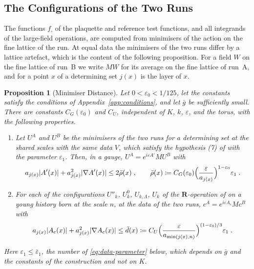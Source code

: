 \documentclass[11pt]{preprint}
\DeclarePairedDelimiter{\abs}{\lvert}{\rvert}
\numberwithin{equation}{section}
\newtheorem{proposition}[theorem]{Proposition}
\theoremstyle{definition}
\theoremstyle{remark}
\theoremstyle{plain}
\begin{document}
\subsection{The Configurations of the Two Runs}\label{sec:configurations}

The functions $f_\square$ of the plaquette and reference test functions, and all integrands of the large-field operations, are computed from minimisers of the action on the fine lattice of the run. At equal data the minimisers of the two runs differ by a lattice artefact, which is the content of the following proposition. For a field $W$ on the fine lattice of run~B we write $MW$ for its average on the fine lattice of run~A, and for a point $x$ of a determining set $j(x)$ is the layer of $x$.

\begin{proposition}[Minimiser Distance]\label{prop:minimiser-distance}
Let $0 < \varepsilon_0 < 1/125$, let the constants satisfy the conditions of Appendix~\ref{app:conditions}, and let $\bar g$ be sufficiently small. There are constants $C_G(\varepsilon_0)$ and $C_U$, independent of $K$, $k$, $\varepsilon$, and the torus, with the following properties.
\begin{enumerate}[label=(\roman*)]
\item Let $U^A$ and $U^B$ be the minimisers of the two runs for a determining set at the shared scales with the same data $V$, which satisfy the hypothesis (7) of \cite[Theorem~1, p.~279]{BalabanVAR} with the parameter $\varepsilon_1$. Then, in a gauge, $U^A = e^{i\varepsilon A'}MU^B$ with
\begin{equation}\label{eq:minimiser-distance}
    a_{j(x)}\abs{A'(x)} + a_{j(x)}^2\abs{\nabla A'(x)} \leq 2\bar\rho(x)\;,
    \qquad
    \bar\rho(x) \coloneqq C_G(\varepsilon_0)\Bigl(\frac{\varepsilon}{a_{j(x)}}\Bigr)^{1-\varepsilon_0}\varepsilon_1\;.
\end{equation}
\item For each of the configurations $U''_k$, $U^0_k$, $U_{k,\Lambda}$, $U_k$ of the $\mathbf R$-operation of \cite[\S1]{BalabanLFR2} on a young history born at the scale $n$, at the data of the two runs, $c^A = e^{i\varepsilon A_c}Mc^B$ with
\begin{equation}\label{eq:coarse-side}
    a_{j(x)}\abs{A_c(x)} + a_{j(x)}^2\abs{\nabla A_c(x)} \leq \bar d(x) \coloneqq C_U\Bigl(\frac{\varepsilon}{a_{\min(j(x), n)}}\Bigr)^{(1-\varepsilon_0)/3}\varepsilon_1\;.
\end{equation}
\end{enumerate}
Here $\varepsilon_1 \leq \bar\varepsilon_1$, the number of \eqref{eq:data-parameter} below, which depends on $\bar g$ and the constants of the construction and not on $K$.
\end{proposition}
\end{document}
